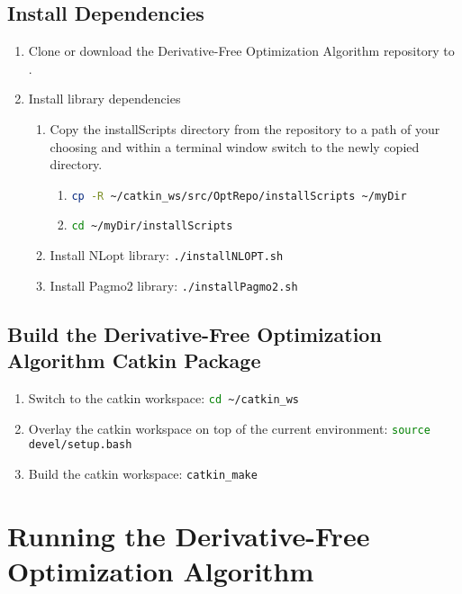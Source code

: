 \documentclass[letterpaper]{article}
\begin{document}
\subsection{Install Dependencies}
\begin{enumerate}
	\item Clone or download the Derivative-Free Optimization Algorithm repository to .
	\item Install library dependencies
		\begin{enumerate}
			\item Copy the installScripts directory from the repository to a path of your choosing and within a terminal window switch to the newly copied directory.
			\begin{enumerate}
				\item \lstinline[language=bash]!cp -R ~/catkin_ws/src/OptRepo/installScripts ~/myDir!
				\item \lstinline[language=bash]!cd ~/myDir/installScripts!
			\end{enumerate}
			\item Install NLopt library: \lstinline[language=bash]!./installNLOPT.sh!
			\item Install Pagmo2 library: \lstinline[language=bash]!./installPagmo2.sh!
		\end{enumerate}
\end{enumerate}
\subsection{Build the Derivative-Free Optimization Algorithm Catkin Package}
\begin{enumerate}
	\item Switch to the catkin workspace: \lstinline[language=bash]!cd ~/catkin_ws!
	\item Overlay the catkin workspace on top of the current environment: \lstinline[language=bash]!source devel/setup.bash!
	\item Build the catkin workspace: \lstinline[language=bash]!catkin_make!
\end{enumerate}

\section{Running the Derivative-Free Optimization Algorithm}
\end{document}
